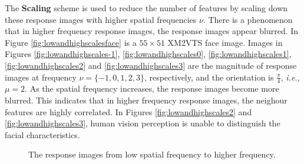The \textbf{Scaling} scheme is used to reduce the number of features by scaling down these response images with higher spatial frequencies $\nu$. There is a phenomenon that in higher frequency response images, the response images appear blurred. In \mbox{Figure} \ref{fig:lowandhighscalesface} is a $55\times51$ \mbox{XM2VTS} face image. Images in \mbox{Figures} \ref{fig:lowandhighscales-1}, \ref{fig:lowandhighscales0}, \ref{fig:lowandhighscales1}, \ref{fig:lowandhighscales2} and \ref{fig:lowandhighscales3} are the magnitude of response images at frequency $\nu=\{-1,0,1,2,3\}$, respectively, and the orientation is $\frac{\pi}{4}$, \textit{i.e.}, $\mu=2$. As the spatial frequency increases, the response images become more blurred. This indicates that in higher frequency response images, the neighour features are highly correlated. In \mbox{Figures} \ref{fig:lowandhighscales2} and \ref{fig:lowandhighscales3}, human vision perception is unable to distinguish the facial characteristics.
\begin{figure}[ht]
\begin{center}
 \caption{The response images from low spatial frequency to higher frequency.}
\label{fig:lowandhighscales}
\end{center}
\end{figure}
